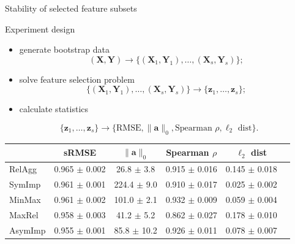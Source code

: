 \documentclass[9pt]{beamer}
\newcommand{\bz}{\mathbf{z}}
\newcommand{\ba}{\mathbf{a}}
\newcommand{\bY}{\mathbf{Y}}
\newcommand{\bX}{\mathbf{X}}
\begin{document}
\begin{frame}{Stability of selected feature subsets}
\begin{block}{Experiment design}
	\begin{itemize}
	\item generate bootstrap data
	\vspace{-0.1cm}
	\[
		(\bX, \bY) \rightarrow \bigl\{(\bX_1, \bY_1), \dots, (\bX_s, \bY_s)\bigr\};
	\]
	\item solve feature selection problem 
	\vspace{-0.1cm}
	\[
		 \bigl\{(\bX_1, \bY_1), \dots, (\bX_s, \bY_s)\bigr\}  \rightarrow \{\bz_1, \dots, \bz_s\};
	\]
	\item calculate statistics
	\vspace{-0.1cm}
	\end{itemize}
	\[
		\{\bz_1, \dots, \bz_s\} \rightarrow \{ \text{RMSE}, \|\ba\|_0, \text{Spearman }\rho, \ell_2 \text{ dist}\}.
	\]
\end{block}
\renewcommand{\arraystretch}{1.2}
\begin{table}[]
	\centering
	\begin{tabular}{l|ccccc}
		\hline
		& sRMSE  & $\|\ba\|_0$ & Spearman $\rho$ & $\ell_2$ dist \\ \hline
		RelAgg & 0.965 $\pm$ 0.002 & 26.8 $\pm$ 3.8 & 0.915 $\pm$ 0.016 & 0.145 $\pm$ 0.018   \\
		SymImp & 0.961 $\pm$ 0.001 & 224.4 $\pm$ 9.0 & 0.910 $\pm$ 0.017 & 0.025 $\pm$ 0.002   \\
		MinMax & 0.961 $\pm$ 0.002 & 101.0 $\pm$ 2.1& 0.932 $\pm$ 0.009 & 0.059 $\pm$ 0.004   \\
		MaxRel & 0.958 $\pm$ 0.003 & 41.2 $\pm$ 5.2 & 0.862 $\pm$ 0.027 & 0.178 $\pm$ 0.010   \\
		AsymImp & 0.955 $\pm$ 0.001 & 85.8 $\pm$ 10.2& 0.926 $\pm$ 0.011 & 0.078 $\pm$ 0.007  \\ \hline
	\end{tabular}
\end{table}
\end{frame}
\end{document}
